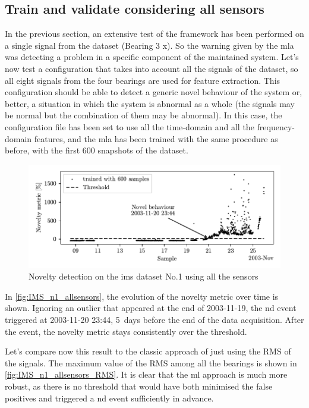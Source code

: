 \subsection{Train and validate considering all sensors}
In the previous section, an extensive test of the framework has been performed on a single signal from the dataset (Bearing 3 x). So the warning given by the \gls{mla} was detecting a problem in a specific component of the maintained system. Let's now test a configuration that takes into account all the signals of the dataset, so all eight signals from the four bearings are used for feature extraction. This configuration should be able to detect a generic novel behaviour of the system or, better, a situation in which the system is abnormal as a whole (the signals may be normal but the combination of them may be abnormal).  In this case, the configuration file has been set to use all the time-domain and all the frequency-domain features, and the \gls{mla} has been trained with the same procedure as before, with the first 600 snapshots of the dataset. 


\begin{figure}
    \centering
    \includegraphics{images/IMS/Novelty_01_500samples_allsensors.pdf}
    \caption{Novelty detection on the \gls{ims} dataset No.1 using all the sensors}
    \label{fig:IMS_n1_allsensors}
\end{figure}

In \autoref{fig:IMS_n1_allsensors}, the evolution of the novelty metric over time is shown. Ignoring an outlier that appeared at the end of 2003-11-19, the \gls{nd} event triggered at 2003-11-20 23:44, 5~days before the end of the data acquisition. After the event, the novelty metric stays consistently over the threshold.

Let's compare now this result to the classic approach of just using the RMS of the signals. The maximum value of the RMS among all the bearings is shown in \autoref{fig:IMS_n1_allsensors_RMS}. It is clear that the \gls{ml} approach is much more robust, as there is no threshold that would have both minimised the false positives and triggered a \gls{nd} event sufficiently in advance.

